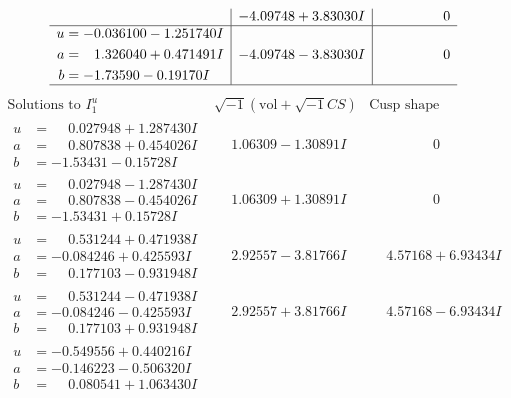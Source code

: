 \documentclass[1p]{elsarticle_modified}
\theoremstyle{definition}
\newcommand{\I}{\sqrt{-1}}
\begin{document}
$$\begin{array}{c|c|c}
 & -4.09748 + 3.83030 I & \phantom{-0.000000 } 0 \\ \hline\begin{aligned}
u &= -0.036100 - 1.251740 I \\
a &= \phantom{-}1.326040 + 0.471491 I \\
b &= -1.73590 - 0.19170 I\end{aligned}
 & -4.09748 - 3.83030 I & \phantom{-0.000000 } 0\\
 \hline 
 \end{array}$$\newpage$$\begin{array}{c|c|c}  
\text{Solutions to }I^u_{1}& \I (\text{vol} + \sqrt{-1}CS) & \text{Cusp shape}\\
 \hline 
\begin{aligned}
u &= \phantom{-}0.027948 + 1.287430 I \\
a &= \phantom{-}0.807838 + 0.454026 I \\
b &= -1.53431 - 0.15728 I\end{aligned}
 & \phantom{-}1.06309 - 1.30891 I & \phantom{-0.000000 } 0 \\ \hline\begin{aligned}
u &= \phantom{-}0.027948 - 1.287430 I \\
a &= \phantom{-}0.807838 - 0.454026 I \\
b &= -1.53431 + 0.15728 I\end{aligned}
 & \phantom{-}1.06309 + 1.30891 I & \phantom{-0.000000 } 0 \\ \hline\begin{aligned}
u &= \phantom{-}0.531244 + 0.471938 I \\
a &= -0.084246 + 0.425593 I \\
b &= \phantom{-}0.177103 - 0.931948 I\end{aligned}
 & \phantom{-}2.92557 - 3.81766 I & \phantom{-}4.57168 + 6.93434 I \\ \hline\begin{aligned}
u &= \phantom{-}0.531244 - 0.471938 I \\
a &= -0.084246 - 0.425593 I \\
b &= \phantom{-}0.177103 + 0.931948 I\end{aligned}
 & \phantom{-}2.92557 + 3.81766 I & \phantom{-}4.57168 - 6.93434 I \\ \hline\begin{aligned}
u &= -0.549556 + 0.440216 I \\
a &= -0.146223 - 0.506320 I \\
b &= \phantom{-}0.080541 + 1.063430 I\end{aligned}

\end{array}$$
\end{document}
